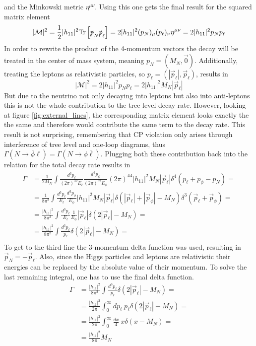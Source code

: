 and the Minkowski metric $\eta^{\mu\nu}$. Using this one gets the final result for the squared matrix element
\begin{equation*}
	|\mathcal{M}|^2=\frac{1}{2}|h_{11}|^2\text{Tr}\left[\slashed p_N \slashed p_\ell\right]=2|h_{11}|^2(p_N)_\mu (p_\ell)_\nu\eta^{\mu\nu}=2|h_{11}|^2p_Np_\ell
\end{equation*}
In order to rewrite the product of the 4-momentum vectors the decay will be treated in the center of mass system, meaning $p_N=(M_N,\vec{0})$. Additionally, treating the leptons as relativistic particles, so $p_\ell=(|\vec{p}_\ell|,\vec{p}_\ell)$, results in
\begin{equation*}
|\mathcal{M}|^2=2|h_{11}|^2p_Np_\ell=2|h_{11}|^2M_N|\vec{p}_\ell|
\end{equation*}
But due to the neutrino not only decaying into leptons but also into anti-leptons this is not the whole contribution to the tree level decay rate. However, looking at figure \ref{fig:external_lines}, the corresponding matrix element looks exactly the the same and therefore would contribute the same term to the decay rate. This result is not surprising, remembering that CP violation only arises through interference of tree level and one-loop diagrams, thus $\Gamma(N\rightarrow\bar{\phi}\ell)=\Gamma(N\rightarrow\phi\bar{\ell})$. Plugging both these contribution back into the relation for the total decay rate results in 
\begin{align*}
	\Gamma&=\frac{1}{2M_N}\int\frac{d^3p_\ell}{(2\pi)^32E_\ell}\frac{d^3p_\phi}{(2\pi)^32E_\phi}(2\pi)^44|h_{11}|^2M_N|\vec{p}_\ell|\delta^4\left(p_\ell+p_\phi-p_N\right)=\\
	&=\frac{1}{8\pi^2}\int\frac{d^3p_\ell}{E_\ell}\frac{d^3p_\phi}{E_\phi}|h_{11}|^2M_N|\vec{p}_\ell|\delta\left(|\vec{p}_\ell|+|\vec{p}_\phi|-M_N\right)\delta^3\left(\vec{p}_\ell+\vec{p}_\phi\right)=\\
	&=\frac{|h_{11}|^2}{8\pi^2}\int\frac{d^3p_\ell}{E_\ell}\frac{1}{E_\phi}|\vec{p}_\ell|\delta\left(2|\vec{p}_\ell|-M_N\right)=\\
	&=\frac{|h_{11}|^2}{8\pi^2}\int\frac{d^3p_\ell}{p_\ell}\delta\left(2|\vec{p}_\ell|-M_N\right)=\\
\end{align*}
To get to the third line the 3-momentum delta function was used, resulting in $\vec{p}_N=-\vec{p}_\ell$. Also, since the Higgs particles and leptons are relativistic their energies can be replaced by the absolute value of their momentum. To solve the last remaining integral, one has to use the final delta function.
\begin{align*}
	\Gamma&=\frac{|h_{11}|^2}{8\pi^2}\int\frac{d^3p_\ell}{p_\ell}\delta\left(2|\vec{p}_\ell|-M_N\right)=\\
	&=\frac{|h_{11}|^2}{2\pi}\int_0^{\infty} dp_\ell \:p_\ell\delta\left(2|\vec{p}_\ell|-M_N\right)=\\
	&=\frac{|h_{11}|^2}{2\pi}\int_0^{\infty} \frac{dx}{4}\:x\delta\left(x-M_N\right)=\\
	&=\frac{|h_{11}|^2}{8\pi}M_N
\end{align*}
